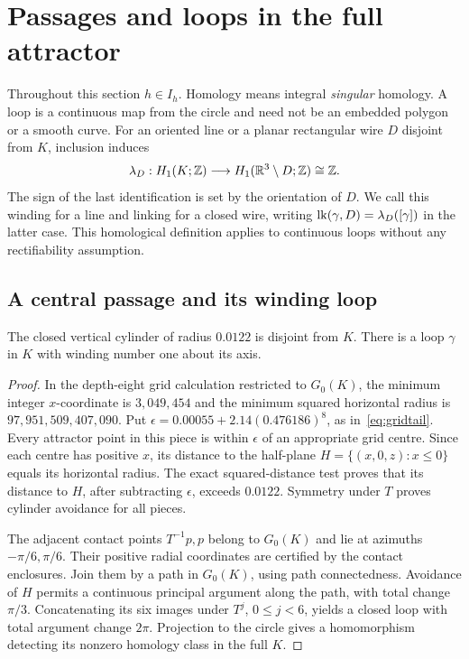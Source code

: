 \section{Passages and loops in the full attractor}\label{sec:loops}
Throughout this section $h\in I_h$. Homology means integral \emph{singular}
homology. A loop is a continuous map from the circle and need not be an
embedded polygon or a smooth curve. For an oriented line or a planar
rectangular wire $D$ disjoint from $K$, inclusion induces
\[
\lambda_D:H_1(K;\mathbb Z)\longrightarrow H_1(\mathbb R^3\setminus D;\mathbb Z)\cong\mathbb Z.
\]
The sign of the last identification is set by the orientation of $D$.
We call this winding for a line and linking for a closed wire, writing
$\operatorname{lk}(\gamma,D)=\lambda_D([\gamma])$ in the latter case. This homological
definition applies to continuous loops without any rectifiability assumption.

\subsection{A central passage and its winding loop}
\begin{proposition}\label{prop:central}
The closed vertical cylinder of radius $0.0122$ is disjoint from $K$.
There is a loop $\gamma$ in $K$ with winding number one about its axis.
\end{proposition}
\begin{proof}
In the depth-eight grid calculation restricted to $G_0(K)$, the minimum
integer $x$-coordinate is $3,049,454$ and the minimum squared horizontal
radius is $97,951,509,407,090$. Put
$\epsilon=0.00055+2.14(0.476186)^8$, as in~\eqref{eq:gridtail}. Every attractor point in this piece is
within $\epsilon$ of an appropriate grid centre. Since each centre has
positive $x$, its distance to the half-plane
$H=\{(x,0,z):x\le0\}$ equals its horizontal radius. The exact squared-distance
test proves that its distance to $H$, after subtracting $\epsilon$, exceeds
$0.0122$. Symmetry under $T$ proves cylinder avoidance for all pieces.

The adjacent contact points $T^{-1}p,p$ belong to $G_0(K)$ and lie at
azimuths $-\pi/6,\pi/6$. Their positive radial coordinates are certified by
the contact enclosures. Join them by a path in $G_0(K)$, using path
connectedness. Avoidance of $H$ permits a continuous principal argument
along the path, with total change $\pi/3$. Concatenating its six images
under $T^j$, $0\le j<6$, yields a closed loop with total argument change
$2\pi$. Projection to the circle gives a homomorphism detecting its
nonzero homology class in the full $K$.
\end{proof}

